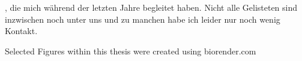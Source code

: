 
, die mich während der letzten Jahre begleitet haben. Nicht alle Gelisteten sind inzwischen noch unter uns und zu manchen habe ich leider nur noch wenig Kontakt.



Selected Figures within this thesis were created using biorender.com
